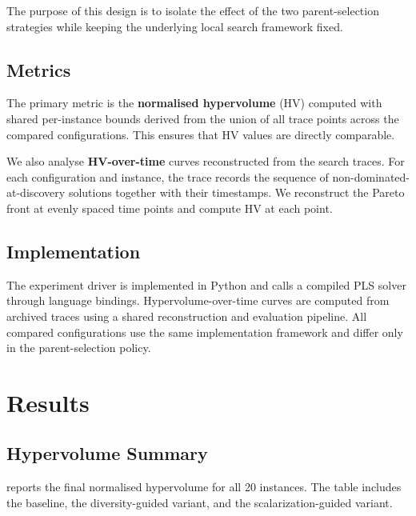 \documentclass[11pt,a4paper]{article}
\begin{document}
The purpose of this design is to isolate the effect of the two
parent-selection strategies while keeping the underlying local search
framework fixed.

\subsection{Metrics}

The primary metric is the \textbf{normalised hypervolume} (HV) computed
with shared per-instance bounds derived from the union of all trace
points across the compared configurations.  This ensures that HV values
are directly comparable.

We also analyse \textbf{HV-over-time} curves reconstructed from the
search traces.  For each configuration and instance, the trace records
the sequence of non-dominated-at-discovery solutions together with their
timestamps.  We reconstruct the Pareto front at evenly spaced time
points and compute HV at each point.

\subsection{Implementation}

The experiment driver is implemented in Python and calls a compiled PLS
solver through language bindings.  Hypervolume-over-time curves are
computed from archived traces using a shared reconstruction and
evaluation pipeline.  All compared configurations use the same
implementation framework and differ only in the parent-selection policy.

\section{Results}\label{sec:results}

\subsection{Hypervolume Summary}

 reports the final normalised hypervolume for all 20
instances.  The table includes the baseline, the diversity-guided
variant, and the scalarization-guided variant.
\end{document}
